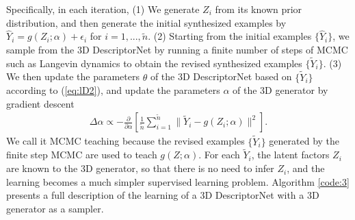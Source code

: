 \documentclass[10pt,twocolumn,letterpaper]{article}
\def\tY{\tilde{Y}}
\def\tn{\tilde{n}}
\def\hY{\hat{Y}}
\begin{document}
Specifically, in each iteration, (1) We generate $Z_i$ from its known prior distribution, and then generate the initial synthesized examples  by $\hY_i = g(Z_i; \alpha)  + \epsilon_i$ for $i=1,...,\tilde n$. (2) Starting from the initial examples $\{\hY_i\}$, we sample from the 3D DescriptorNet by running a finite number of steps of MCMC such as Langevin dynamics  to obtain the revised synthesized examples $\{\tY_i\}$. (3) We then update the parameters $\theta$ of the 3D DescriptorNet based on $\{\tY_i\}$ according to (\ref{eq:lD2}), and update the parameters $\alpha$ of the 3D generator by gradient descent 
\begin{eqnarray}
\Delta \alpha \propto - \frac{\partial}{\partial \alpha} \left[\frac{1}{\tn} \sum_{i=1}^{\tilde n} \|\tY_i - g(Z_i; \alpha)\|^2\right]. \label{eq:alpha}
\end{eqnarray}
 We call it MCMC teaching because the revised examples $\{\tY_i\}$ generated by the finite step MCMC are used to teach $g(Z; \alpha)$. 
For each $\tY_i$,  the latent factors $Z_i$ are known to the 3D generator, so that there is no need to infer $Z_i$, and the learning becomes a much simpler supervised learning problem. %
Algorithm \ref{code:3} presents a full description of the learning of a 3D DescriptorNet with a 3D generator as a sampler.   

\end{document}

